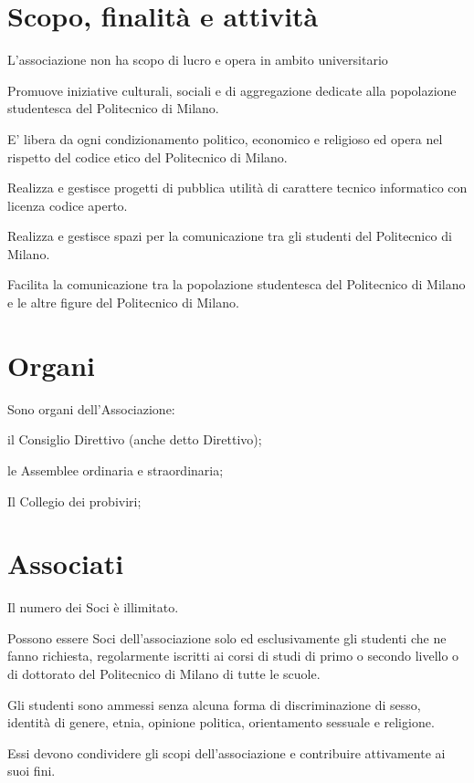 \documentclass[legalpaper, 11pt]{exam}
\let\tempone\enumerate
\let\temptwo\endenumerate
\renewenvironment{enumerate}{\tempone\addtolength{\itemsep}{-0.45\baselineskip}}{\temptwo}
\begin{document}
\section{Scopo, finalità e attività}
\begin{enumerate}
 \item L’associazione non ha scopo di lucro e opera in ambito universitario
 \item Promuove iniziative culturali, sociali e di aggregazione dedicate alla popolazione studentesca del Politecnico di Milano.
 \item E’ libera da ogni condizionamento politico, economico e religioso ed opera nel rispetto del codice etico del Politecnico di Milano.
 \item Realizza e gestisce progetti di pubblica utilità di carattere tecnico informatico con licenza codice aperto.
 \item Realizza e gestisce spazi per la comunicazione tra gli studenti del Politecnico di Milano.
 \item Facilita la comunicazione tra la popolazione studentesca del Politecnico di Milano e le altre figure del Politecnico di Milano.
\end{enumerate}

\section{Organi}
Sono organi dell’Associazione: 
\vspace{-5pt}
\begin{enumerate}
	\item il Consiglio Direttivo (anche detto Direttivo);
	\item le Assemblee ordinaria e straordinaria;
	\item Il Collegio dei probiviri;
\end{enumerate}

\section{Associati}
\begin{enumerate}
 \item Il numero dei Soci è illimitato. 
 \item Possono essere Soci dell’associazione solo ed esclusivamente gli studenti che ne fanno richiesta, regolarmente iscritti ai corsi di studi di primo o secondo livello o di dottorato del Politecnico di Milano di tutte le scuole.
 \item Gli studenti sono ammessi senza alcuna forma di discriminazione di sesso, identità di genere, etnia, opinione politica, orientamento sessuale e religione.
 \item Essi devono condividere gli scopi dell’associazione e contribuire attivamente ai suoi fini.
\end{enumerate}
\end{document}
